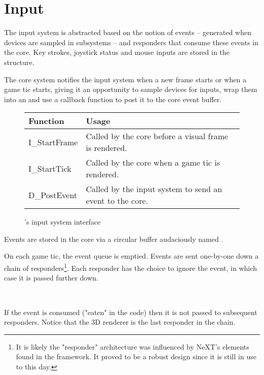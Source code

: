 \section{Input}
The input system is abstracted based on the notion of events -- generated when devices are sampled in subsystems -- and responders that consume these events in the core. Key strokes, joystick status and mouse inputs are stored in the  structure.\\
\par
{}
\par
The core system notifies the input system when a new frame starts or when a game tic starts, giving it an opportunity to sample devices for inputs, wrap them into an  and use a callback function to post it to the core event buffer.\\
\par
\begin{figure}[H]
\centering  
\begin{tabularx}{\textwidth}{ L{0.6}  L{1.4}}
  \toprule
  \textbf{Function} &  \textbf{Usage}\\
  \toprule 
  I\_StartFrame & Called by the core before a visual frame is rendered.\\
  I\_StartTick & Called by the core when a game tic is rendered.\\
  
  D\_PostEvent & Called by the input system to send an event to the core.\\
   \toprule
\end{tabularx}
\caption{\doom{}'s input system interface}
\end{figure}
\par
Events are stored in the core via a circular buffer audaciously named .\\
\par
{}

\par
On each game tic, the event queue is emptied. Events are sent one-by-one down a chain of responders\footnote{It is likely the "responder" architecture was influenced by NeXT's  elements found in the  framework. It proved to be a robust design since it is still in use to this day.}. Each responder has the choice to ignore the event, in which case it is passed further down.\\
\par
{}\\
 \par If the event is consumed ("eaten" in the code) then it is not passed to subsequent responders. Notice that the 3D renderer is the last responder in the chain.\\
 

